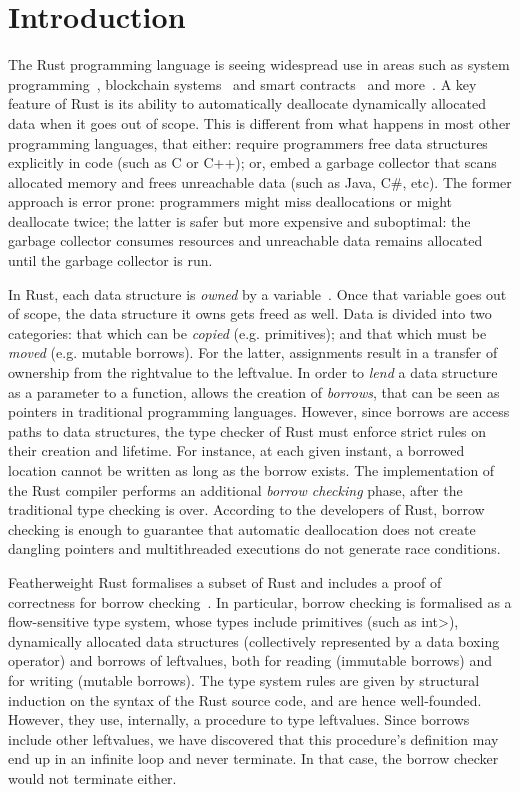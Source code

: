 \section{Introduction}\label{sec:introduction}

The Rust programming language is seeing widespread use in areas such
as system programming~\cite{ABGMMMS16,BBBPRR17,LCGPDL17}, blockchain
systems~\cite{HHHH18,NQ20} and smart
contracts~\cite{Ash20,ZHCKHJJMS20} and more~\cite{BHR18,AMPS19}.  A
key feature of Rust is its ability to automatically deallocate
dynamically allocated data when it goes out of scope. This is
different from what happens in most other programming languages, that
either: require programmers free data structures explicitly in code
(such as C or C++); or, embed a garbage collector that scans allocated
memory and frees unreachable data (such as Java, C\#, etc).  The
former approach is error prone: programmers might miss deallocations
or might deallocate twice; the latter is safer but more expensive and
suboptimal: the garbage collector consumes resources and unreachable
data remains allocated until the garbage collector is run.

In Rust, each data structure is \emph{owned} by a
variable~\cite{RustBook}. Once that variable goes out of scope, the
data structure it owns gets freed as well.  Data is divided into two
categories: that which can be {\em copied} (e.g. primitives); and that
which must be {\em moved} (e.g. mutable borrows).  For the latter,
assignments result in a transfer of ownership from the rightvalue to
the leftvalue.  In order to \emph{lend} a data structure as a
parameter to a function,  allows the
creation of \emph{borrows}, that can be seen as pointers in
traditional programming languages.  However, since borrows are access
paths to data structures, the type checker of Rust must enforce strict
rules on their creation and lifetime. For instance, at each given
instant, a borrowed location cannot be written as long as the borrow
exists.  The implementation of the Rust compiler performs an
additional \emph{borrow checking} phase, after the traditional type
checking is over.  According to the developers of Rust, borrow
checking is enough to guarantee that automatic deallocation does not
create dangling pointers and multithreaded executions do not generate
race conditions.

Featherweight Rust formalises a subset of Rust and includes a proof of
correctness for borrow checking~\cite{Pearce21}.  In particular,
borrow checking is formalised as a flow-sensitive type system, whose
types include primitives (such as \<int>), dynamically allocated data
structures (collectively represented by a data boxing operator) and
borrows of leftvalues, both for reading (immutable borrows) and for
writing (mutable borrows). The type system rules are given by
structural induction on the syntax of the Rust source code, and are
hence well-founded. However, they use, internally, a procedure to type
leftvalues. Since borrows include other leftvalues, we have discovered
that this procedure's definition may end up in an infinite loop and
never terminate.  In that case, the borrow checker would not terminate
either.

